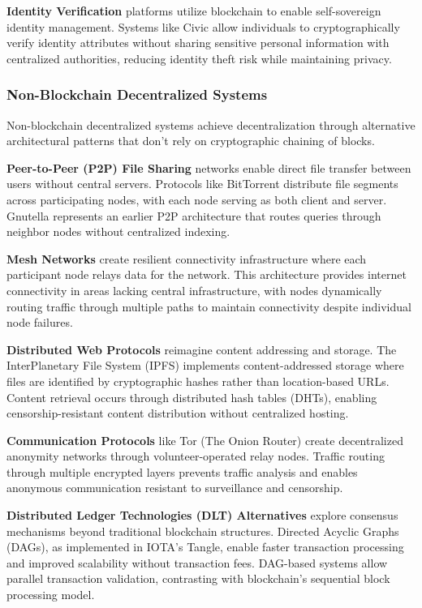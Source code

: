 \textbf{Identity Verification} platforms utilize blockchain to enable self-sovereign identity management. Systems like Civic allow individuals to cryptographically verify identity attributes without sharing sensitive personal information with centralized authorities, reducing identity theft risk while maintaining privacy.

\subsubsection{Non-Blockchain Decentralized Systems}
\label{subsubsec:non-blockchain-decentralized}

Non-blockchain decentralized systems achieve decentralization through alternative architectural patterns that don't rely on cryptographic chaining of blocks.

\textbf{Peer-to-Peer (P2P) File Sharing} networks enable direct file transfer between users without central servers. Protocols like BitTorrent distribute file segments across participating nodes, with each node serving as both client and server. Gnutella represents an earlier P2P architecture that routes queries through neighbor nodes without centralized indexing.

\textbf{Mesh Networks} create resilient connectivity infrastructure where each participant node relays data for the network. This architecture provides internet connectivity in areas lacking central infrastructure, with nodes dynamically routing traffic through multiple paths to maintain connectivity despite individual node failures.

\textbf{Distributed Web Protocols} reimagine content addressing and storage. The InterPlanetary File System (IPFS) implements content-addressed storage where files are identified by cryptographic hashes rather than location-based URLs. Content retrieval occurs through distributed hash tables (DHTs), enabling censorship-resistant content distribution without centralized hosting.

\textbf{Communication Protocols} like Tor (The Onion Router) create decentralized anonymity networks through volunteer-operated relay nodes. Traffic routing through multiple encrypted layers prevents traffic analysis and enables anonymous communication resistant to surveillance and censorship.

\textbf{Distributed Ledger Technologies (DLT) Alternatives} explore consensus mechanisms beyond traditional blockchain structures. Directed Acyclic Graphs (DAGs), as implemented in IOTA's Tangle, enable faster transaction processing and improved scalability without transaction fees. DAG-based systems allow parallel transaction validation, contrasting with blockchain's sequential block processing model.

